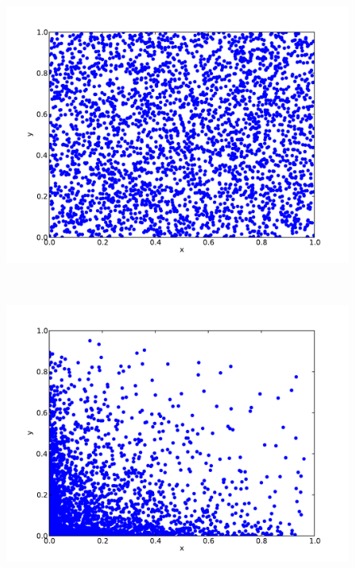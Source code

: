 \begin{figure}
		\begin{center}
			\begin{subfloat}{%
				\includegraphics[scale=0.25]{figures/uniform_distribution.pdf}
			}
			\end{subfloat}~
			\begin{subfloat}{%
				\includegraphics[scale=0.25]{figures/skewed_distribution.pdf}
			}
			\end{subfloat}~

\end{center}
\end{figure}
